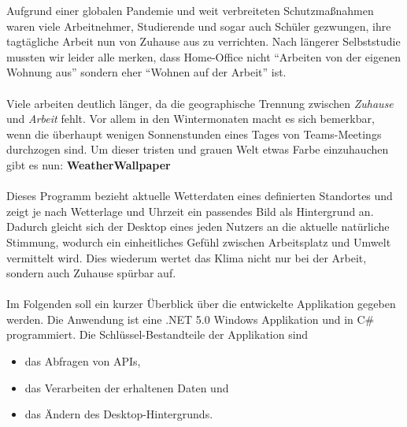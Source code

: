 Aufgrund einer globalen Pandemie und weit verbreiteten Schutzmaßnahmen waren viele Arbeitnehmer, Studierende und sogar auch Schüler gezwungen, ihre tagtägliche Arbeit nun von Zuhause aus zu verrichten.
Nach längerer Selbststudie mussten wir leider alle merken, dass Home-Office nicht \enquote{Arbeiten von der eigenen Wohnung aus} sondern eher  \enquote{Wohnen auf der Arbeit} ist.\\
\\
Viele arbeiten deutlich länger, da die geographische Trennung zwischen \textit{Zuhause} und \textit{Arbeit} fehlt.
Vor allem in den Wintermonaten macht es sich bemerkbar, wenn die überhaupt wenigen Sonnenstunden eines Tages von Teams-Meetings durchzogen sind.
Um dieser tristen und grauen Welt etwas Farbe einzuhauchen gibt es nun: \textbf{WeatherWallpaper}\\
\\
Dieses Programm bezieht aktuelle Wetterdaten eines definierten Standortes und zeigt je nach Wetterlage und Uhrzeit ein passendes Bild als Hintergrund an.
Dadurch gleicht sich der Desktop eines jeden Nutzers an die aktuelle natürliche Stimmung, wodurch ein einheitliches Gefühl zwischen Arbeitsplatz und Umwelt vermittelt wird.
Dies wiederum wertet das Klima nicht nur bei der Arbeit, sondern auch Zuhause spürbar auf.\\
\\
Im Folgenden soll ein kurzer Überblick über die entwickelte Applikation gegeben werden. Die Anwendung ist eine .NET 5.0 Windows Applikation und in C\# programmiert. Die Schlüssel-Bestandteile der Applikation sind \begin{itemize}
\item das Abfragen von APIs,
\item das Verarbeiten der erhaltenen Daten und
\item das Ändern des Desktop-Hintergrunds.
\end{itemize}
